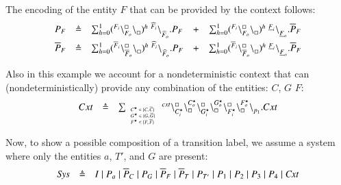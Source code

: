 The encoding of the entity $F$ that can be provided by the context follows:
\[
\begin{array}{lcllcl}
P_F&\triangleq & \sum_{h=0}^1 ({}^{F_i}\backslash_{F_o}^{\scriptstyle {\square}}\backslash_{\scriptstyle {\square}}^{})^h\ {}^{\widehat{F}_i} \backslash_{\widehat{F}_o}^{}.P_F
& +  & \sum_{h=0}^1 ({}^{F_i}\backslash_{F_o}^{\scriptstyle {\square}}\backslash_{\scriptstyle {\square}}^{})^h\ {}^{\underline{F}_i} \backslash_{\underline{F}_o}^{}.\overline{P}_F \\[6pt]
\overline{P}_F&\triangleq & \sum_{h=0}^1 ({}^{\overline{F}_i}\backslash_{\overline{F}_o}^{\scriptstyle {\square}}\backslash_{\scriptstyle {\square}}^{})^h\ {}^{\widehat{F}_i} \backslash_{\widehat{F}_o}^{}.P_F
& +  & \sum_{h=0}^1 ({}^{\overline{F}_i}\backslash_{\overline{F}_o}^{\scriptstyle {\square}}\backslash_{\scriptstyle {\square}}^{})^h\ {}^{\underline{F}_i} \backslash_{\underline{F}_o}^{}.\overline{P}_F \\
\end{array}
\]

Also in this example we account for a nondeterministic context that can (nondeterministically) provide any combination of the entities: $C$, $G$ $F$:
\[
\begin{array}{lcl}
 Cxt & \triangleq &
 \sum_{\tiny \begin{array}{l}C^{\star} \in \{C,\overline{C}\}\\G^{\star} \in \{G,\overline{G}\}\\
 F^{\star} \in \{F,\overline{F}\}
  \end{array}}
 {}^{cxt} \backslash_{C_i^{\star}}^{\scriptstyle {\square}}\backslash_{\scriptstyle {\square}}^{C_o^{\star}}\backslash_{G_i^{\star}}^{\scriptstyle {\square}}\backslash_{\scriptstyle {\square}}^{G_o^{\star}}
 \backslash_{F_i^{\star}}^{\scriptstyle {\square}}\backslash_{\scriptstyle {\square}}^{F_o^{\star}}\backslash_{p_1}^{}.Cxt\\
\end{array}
\]

Now, to show a possible composition of a transition label, we assume a system where only the entities $a$, $T'$, and $G$ are present:
\[
\begin{array}{lcl}
\mathit{Sys} &\defeq &%
I\mid P_a\mid \overline{P}_C\mid P_G\mid \overline{P}_F \mid \overline{P}_T \mid P_{T'} \mid P_1 \mid P_2 \mid P_3 \mid P_4 \mid \mathit{Cxt}
\end{array}
\]

